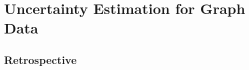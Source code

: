 \chapter{Uncertainty Estimation for Graph Data}
\label{chap:graph_data}




% 
% 

\section*{Retrospective}
%